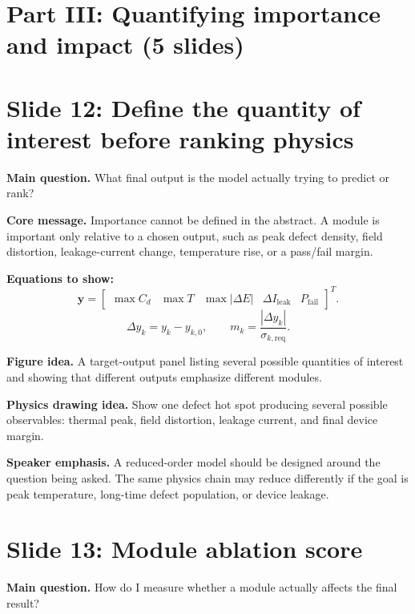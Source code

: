 \documentclass[11pt]{article}
\begin{document}
\section{Part III: Quantifying importance and impact (5 slides)}

\section{Slide 12: Define the quantity of interest before ranking physics}
\begin{physicsbox}
\textbf{Main question.} What final output is the model actually trying to predict or rank?
\end{physicsbox}

\textbf{Core message.} Importance cannot be defined in the abstract. A module is important only relative to a chosen output, such as peak defect density, field distortion, leakage-current change, temperature rise, or a pass/fail margin.

\textbf{Equations to show:}
\begin{equation*}
\mathbf{y}=\begin{bmatrix}
\max C_d & \max T & \max |\Delta E| & \Delta I_{\mathrm{leak}} & P_{\mathrm{fail}}
\end{bmatrix}^{T}.
\end{equation*}
\begin{equation*}
\Delta y_k = y_k - y_{k,0},
\qquad
m_k=\frac{|\Delta y_k|}{\sigma_{k,\mathrm{req}}}.
\end{equation*}

\textbf{Figure idea.} A target-output panel listing several possible quantities of interest and showing that different outputs emphasize different modules.

\textbf{Physics drawing idea.} Show one defect hot spot producing several possible observables: thermal peak, field distortion, leakage current, and final device margin.

\textbf{Speaker emphasis.} A reduced-order model should be designed around the question being asked. The same physics chain may reduce differently if the goal is peak temperature, long-time defect population, or device leakage.

\section{Slide 13: Module ablation score}
\begin{physicsbox}
\textbf{Main question.} How do I measure whether a module actually affects the final result?
\end{physicsbox}
\end{document}
